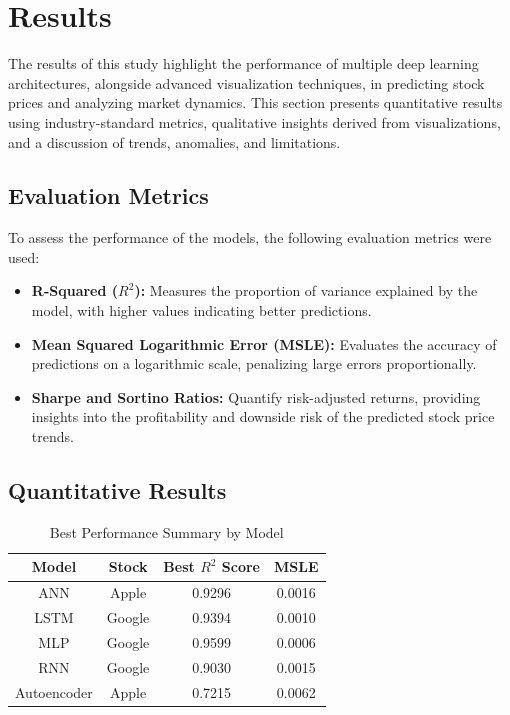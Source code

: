 \documentclass[conference]{IEEEtran}
\begin{document}
\section{Results}

The results of this study highlight the performance of multiple deep learning architectures, alongside advanced visualization techniques, in predicting stock prices and analyzing market dynamics. This section presents quantitative results using industry-standard metrics, qualitative insights derived from visualizations, and a discussion of trends, anomalies, and limitations.

\subsection{Evaluation Metrics}
To assess the performance of the models, the following evaluation metrics were used:
\begin{itemize}
    \item \textbf{R-Squared ($R^2$):} Measures the proportion of variance explained by the model, with higher values indicating better predictions.
    \item \textbf{Mean Squared Logarithmic Error (MSLE):} Evaluates the accuracy of predictions on a logarithmic scale, penalizing large errors proportionally.
    \item \textbf{Sharpe and Sortino Ratios:} Quantify risk-adjusted returns, providing insights into the profitability and downside risk of the predicted stock price trends.
\end{itemize}

\subsection{Quantitative Results}

\begin{table}[h!]
    \centering
    \caption{Best Performance Summary by Model}
    \label{tab:results_summary}
    \begin{tabular}{|c|c|c|c|}
    \hline
    \textbf{Model} & \textbf{Stock}  & \textbf{Best $R^2$ Score} & \textbf{MSLE} \\ \hline
    ANN            & Apple           & 0.9296           & 0.0016        \\ \hline
    LSTM           & Google          & 0.9394           & 0.0010        \\ \hline
    MLP            & Google          & 0.9599           & 0.0006        \\ \hline
    RNN            & Google          & 0.9030           & 0.0015        \\ \hline
    Autoencoder    & Apple           & 0.7215           & 0.0062        \\ \hline
    \end{tabular}
\end{table}
\end{document}
